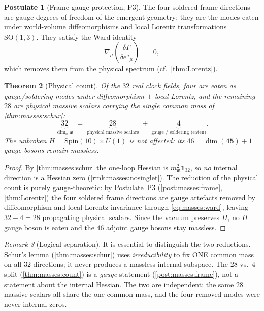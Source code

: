 \documentclass[11pt]{article}
\theoremstyle{plain}
\newtheorem{theorem}{Theorem}[section]
\theoremstyle{definition}
\newtheorem{postulate}[theorem]{Postulate}
\theoremstyle{remark}
\newtheorem{remark}[theorem]{Remark}
\begin{document}
\begin{postulate}[Frame gauge protection, P3]\label{post:masses:frame}
The four soldered frame directions are gauge degrees of freedom of the emergent
geometry: they are the modes eaten under world-volume diffeomorphisms and local
Lorentz transformations $\mathrm{SO}(1,3)$. They satisfy the Ward identity
\begin{equation}\label{eq:masses:ward}
  \nabla_{\mu}\!\left(\frac{\delta\Gamma}{\delta e^{a}{}_{\mu}}\right) \;=\; 0,
\end{equation}
which removes them from the physical spectrum (cf.\ \autoref{thm:Lorentz}).
\end{postulate}

\begin{theorem}[Physical count]\label{thm:masses:count}
Of the $32$ real clock fields, four are eaten as gauge/soldering modes under
diffeomorphism $+$ local Lorentz, and the remaining $28$ are physical massive
scalars carrying the single common mass of \autoref{thm:masses:schur}:
\begin{equation}\label{eq:masses:count}
  \underbrace{32}_{\dim_{\mathbb R}\mathfrak m}
  \;=\;
  \underbrace{28}_{\text{physical massive scalars}}
  \;+\;
  \underbrace{4}_{\text{gauge / soldering (eaten)}} .
\end{equation}
The unbroken $H=\mathrm{Spin}(10)\times U(1)$ is not affected: its
$46=\dim(\mathbf{45})+1$ gauge bosons remain massless.
\end{theorem}

\begin{proof}
By \autoref{thm:masses:schur} the one-loop Hessian is $m_{\mathfrak m}^{2}
\mathbf 1_{32}$, so \emph{no} internal direction is a Hessian zero
(\autoref{rmk:masses:nosinglet}). The reduction of the physical count is purely
gauge-theoretic: by Postulate~P3 (\autoref{post:masses:frame},
\autoref{thm:Lorentz}) the four soldered frame directions are gauge artefacts
removed by diffeomorphism and local Lorentz invariance through
\eqref{eq:masses:ward}, leaving $32-4=28$ propagating physical scalars. Since
the vacuum preserves $H$, no $H$ gauge boson is eaten and the $46$ adjoint
gauge bosons stay massless.
\end{proof}

\begin{remark}[Logical separation]\label{rmk:masses:separation}
It is essential to distinguish the two reductions. Schur's lemma
(\autoref{thm:masses:schur}) uses \emph{irreducibility} to fix ONE common mass
on all $32$ directions; it never produces a massless internal subspace. The
$28$ vs.\ $4$ split (\autoref{thm:masses:count}) is a \emph{gauge} statement
(\autoref{post:masses:frame}), not a statement about the internal Hessian. The
two are independent: the same $28$ massive scalars all share the one common
mass, and the four removed modes were never internal zeros.
\end{remark}
\end{document}
